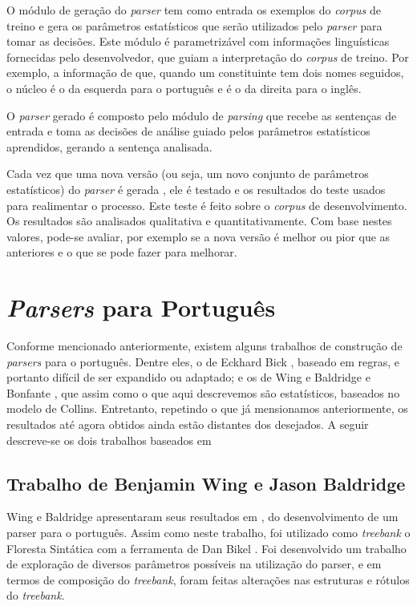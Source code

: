 O módulo de geração do \emph{parser} tem como entrada os exemplos do \emph{corpus} de treino e gera os parâmetros estatísticos que serão utilizados pelo \emph{parser} para tomar as decisões. Este módulo é parametrizável com informações linguísticas fornecidas pelo desenvolvedor, que guiam a interpretação do \emph{corpus} de treino. Por exemplo, a informação de que, quando um constituinte tem dois nomes seguidos, o núcleo é o da esquerda para o português e é o da direita para o inglês.

O \emph{parser} gerado é composto pelo módulo de \emph{parsing} que recebe as sentenças de entrada e toma as decisões de análise guiado pelos parâmetros estatísticos aprendidos, gerando a sentença analisada.

Cada vez que uma nova versão (ou seja, um novo conjunto de parâmetros estatísticos) do \emph{parser} é gerada , ele é testado e os resultados do teste usados para realimentar o processo. Este teste é feito sobre o \emph{corpus} de desenvolvimento. Os resultados são analisados qualitativa e quantitativamente. Com base nestes valores, pode-se avaliar, por exemplo se a nova versão é melhor ou pior que as anteriores e o que se pode fazer para melhorar.


\section{\emph{Parsers} para Português} %
\label{sec:parsers_para_portugues}

Conforme mencionado anteriormente, existem alguns trabalhos de construção de \emph{parsers} para o português. Dentre eles, o de Eckhard Bick \cite{bick00}, baseado em regras, e portanto difícil de ser expandido ou adaptado; e os de Wing e Baldridge \cite{baldridge06} e Bonfante \cite{bonfante03}, que assim como o que aqui descrevemos são estatísticos, baseados no modelo de Collins. Entretanto, repetindo o que já mensionamos anteriormente, os resultados até agora obtidos ainda estão distantes dos desejados. A seguir descreve-se os dois trabalhos baseados em \cite{collins99}


\subsection{Trabalho de Benjamin Wing e Jason Baldridge} %
\label{sec:wing_baldridge}

Wing e Baldridge apresentaram seus resultados em \cite{baldridge06}, do desenvolvimento de um parser para o português. Assim como neste trabalho, foi utilizado como \emph{treebank} o Floresta Sintática com a ferramenta de Dan Bikel \cite{bikel02}. Foi desenvolvido um trabalho de exploração de diversos parâmetros possíveis na utilização do parser, e em termos de composição do \emph{treebank}, foram feitas alterações nas estruturas e rótulos do \emph{treebank}.

